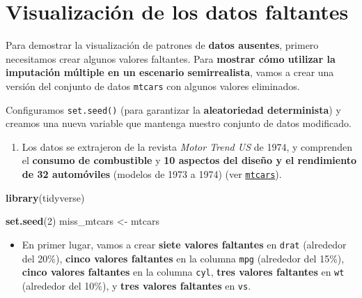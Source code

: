 \documentclass[
]{book}
\newenvironment{Shaded}{\begin{snugshade}}{\end{snugshade}}
\newcommand{\DecValTok}[1]{\textcolor[rgb]{0.00,0.00,0.81}{#1}}
\newcommand{\FunctionTok}[1]{\textcolor[rgb]{0.13,0.29,0.53}{\textbf{#1}}}
\newcommand{\NormalTok}[1]{#1}
\newcommand{\OtherTok}[1]{\textcolor[rgb]{0.56,0.35,0.01}{#1}}
\providecommand{\tightlist}{%
  \setlength{\itemsep}{0pt}\setlength{\parskip}{0pt}}
\begin{document}
\section{Visualización de los datos faltantes}\label{visualizaciuxf3n-de-los-datos-faltantes}

Para demostrar la visualización de patrones de \textbf{datos ausentes}, primero necesitamos crear algunos valores faltantes. Para \textbf{mostrar cómo utilizar la imputación múltiple en un escenario semirrealista}, vamos a crear una versión del conjunto de datos \texttt{mtcars} con algunos valores eliminados.

Configuramos \texttt{set.seed()} (para garantizar la \textbf{aleatoriedad determinista}) y creamos una nueva variable que mantenga nuestro conjunto de datos modificado.

\begin{enumerate}
\def\labelenumi{\arabic{enumi}.}
\tightlist
\item
  Los datos se extrajeron de la revista \emph{Motor Trend US} de 1974, y comprenden el \textbf{consumo de combustible} y \textbf{10 aspectos del diseño y el rendimiento de 32 automóviles} (modelos de 1973 a 1974) (ver \href{https://www.rdocumentation.org/packages/datasets/versions/3.6.2/topics/mtcars}{\texttt{mtcars}}).
\end{enumerate}

\begin{Shaded}
\begin{Highlighting}[]
\FunctionTok{library}\NormalTok{(tidyverse)}

\FunctionTok{set.seed}\NormalTok{(}\DecValTok{2}\NormalTok{)}
\NormalTok{miss\_mtcars }\OtherTok{\textless{}{-}}\NormalTok{ mtcars}
\end{Highlighting}
\end{Shaded}

\begin{itemize}
\tightlist
\item
  En primer lugar, vamos a crear \textbf{siete valores faltantes} en \texttt{drat} (alrededor del 20\%), \textbf{cinco valores faltantes} en la columna \texttt{mpg} (alrededor del 15\%), \textbf{cinco valores faltantes} en la columna \texttt{cyl}, \textbf{tres valores faltantes} en \texttt{wt} (alrededor del 10\%), y \textbf{tres valores faltantes} en \texttt{vs}.
\end{itemize}
\end{document}
